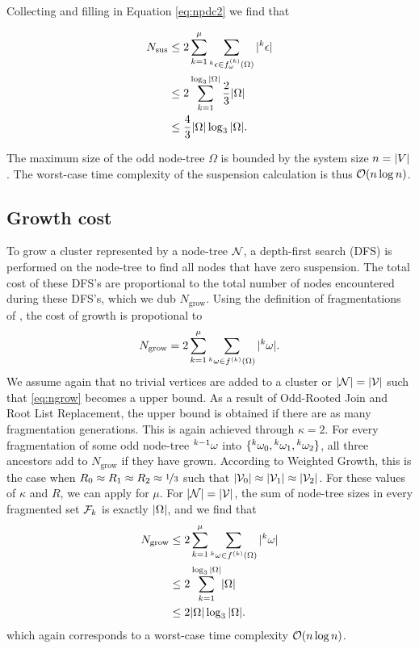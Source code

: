 Collecting  and filling in Equation \eqref{eq:npdc2} we find that

\begin{align*}
  \nonumber N_{\text{sus}} &\leq 2\sum_{k=1}^\mu{ \sum_{  {}^{k} \epsilon \in f_\omega^{(k)}(\Omega) }{ \lvert {}^{k} \epsilon\rvert}  } \\
  \nonumber         &\leq 2\sum_{k=1}^{\log_3{\lvert\Omega\rvert}} \frac{2}{3}\lvert\Omega\rvert\\
                    &\leq \frac{4}{3}\lvert\Omega\rvert\log_3{\lvert\Omega\rvert}.
\end{align*}

The maximum size of the odd node-tree $\Omega$ is bounded by the system size $n = \lvert V\rvert$. The worst-case time complexity of the suspension calculation is thus $\mathcal{O}(n\log{n})$. 

\subsection{Growth cost}\label{sec:growthcost}

To grow a cluster represented by a node-tree $\mathcal{N}$, a depth-first search (DFS) is performed on the node-tree to find all nodes that have zero suspension. The total cost of these DFS's are proportional to the total number of nodes encountered during these DFS's, which we dub $N_{\text{grow}}$. Using the definition of fragmentations of , the cost of growth is propotional to
\begin{equation}\label{eq:ngrow}
  N_{\text{grow}} = 2\sum_{k=1}^\mu{ \sum_{ \pre{k}\omega \in f^{(k)}(\Omega) }{ \abs{\pre{k}\omega}} }.
\end{equation}
We assume again that no trivial vertices are added  to a cluster or $|\mathcal{N}| = |\mathcal{V}|$ such that \eqref{eq:ngrow} becomes a upper bound. As a result of Odd-Rooted Join and Root List Replacement, the upper bound is obtained if there are as many fragmentation generations. This is again achieved through $\kappa = 2$. For every fragmentation of some odd node-tree ${}^{k-1}\omega$ into $\{{}^{k}\omega_0, {}^{k}\omega_1, {}^{k}\omega_2\}$, all three ancestors add to $N_{\text{grow}}$ if they have grown. According to Weighted Growth, this is the case when $R_0 \approx R_1 \approx R_2\approx \nicefrac{1}{3}$ such that $\lvert\mathcal{V}_0\rvert\approx \lvert\mathcal{V}_1\rvert\approx\lvert\mathcal{V}_2\rvert$. For these values of $\kappa$ and $R$, we can apply  for $\mu$. For $|\mathcal{N}| = |\mathcal{V}|$, the sum of node-tree sizes in every fragmented set $\mathcal{F}_k$ is exactly $\lvert\Omega\rvert$, and we find that
\begin{align*}
  \nonumber N_{\text{grow}} &\leq 2\sum_{k=1}^\mu{ \sum_{  {}^{k} \omega \in f^{(k)}(\Omega) }{ \lvert {}^{k} \omega\rvert}  } \\
  \nonumber         &\leq 2\sum_{k=1}^{\log_3{\lvert\Omega\rvert}} \lvert\Omega\rvert\\
                    &\leq 2\lvert\Omega\rvert\log_3{\lvert\Omega\rvert}.
\end{align*}
which again corresponds to a worst-case time complexity $\mathcal{O}(n\log{n})$.